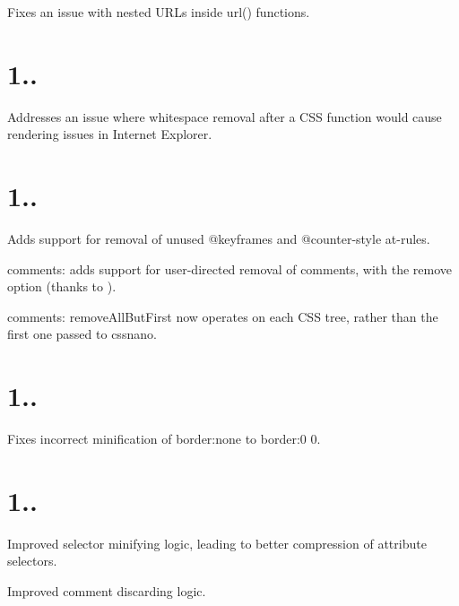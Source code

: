 \begin{DoxyItemize}
\item Fixes an issue with nested U\+R\+Ls inside {\ttfamily url()} functions.
\end{DoxyItemize}

\section*{1..}


\begin{DoxyItemize}
\item Addresses an issue where whitespace removal after a C\+SS function would cause rendering issues in Internet Explorer.
\end{DoxyItemize}

\section*{1..}


\begin{DoxyItemize}
\item Adds support for removal of unused {\ttfamily @keyframes} and {\ttfamily @counter-\/style} at-\/rules.
\item comments\+: adds support for user-\/directed removal of comments, with the {\ttfamily remove} option (thanks to ).
\item comments\+: {\ttfamily remove\+All\+But\+First} now operates on each C\+SS tree, rather than the first one passed to cssnano.
\end{DoxyItemize}

\section*{1..}


\begin{DoxyItemize}
\item Fixes incorrect minification of {\ttfamily border\+:none} to {\ttfamily border\+:0 0}.
\end{DoxyItemize}

\section*{1..}


\begin{DoxyItemize}
\item Improved selector minifying logic, leading to better compression of attribute selectors.
\item Improved comment discarding logic.
\end{DoxyItemize}

